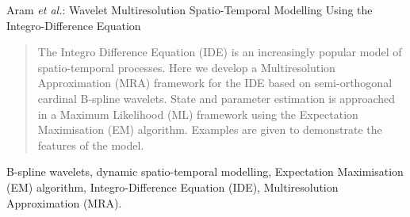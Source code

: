 \documentclass[draftcls,onecolumn]{IEEEtran}
\begin{document}
%
{Aram \MakeLowercase{\textit{et al.}}: Wavelet Multiresolution Spatio-Temporal Modelling Using the Integro-Difference Equation}
% 











\maketitle


\begin{abstract}
The Integro Difference Equation (IDE) is an increasingly popular model of spatio-temporal processes. Here we develop a Multiresolution Approximation (MRA) framework for the IDE based on semi-orthogonal cardinal B-spline wavelets. State and parameter estimation is approached in a Maximum Likelihood (ML) framework using the Expectation Maximisation (EM) algorithm. Examples are given to demonstrate the features of the model.
\end{abstract}

\begin{IEEEkeywords}
B-spline wavelets, dynamic spatio-temporal modelling, Expectation Maximisation (EM) algorithm, Integro-Difference Equation (IDE), Multiresolution Approximation (MRA).
\end{IEEEkeywords}
\end{document}
